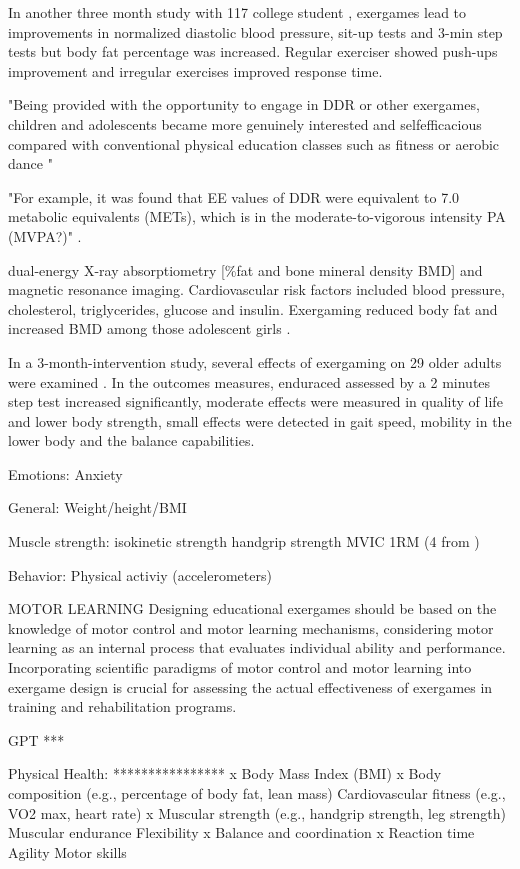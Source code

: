 In another three month study with 117 college student \cite{huang2017can}, exergames lead to improvements in normalized diastolic blood pressure, sit-up tests and 3-min step tests but body fat percentage was increased. Regular exerciser showed push-ups improvement and irregular exercises improved response time.

"Being provided with the opportunity to engage in DDR or other exergames, children and adolescents became more genuinely interested and selfefficacious compared with conventional physical education classes such as fitness or aerobic dance "

"For example, it was found that EE values of DDR were equivalent to 7.0 metabolic equivalents (METs), which is in the moderate-to-vigorous intensity PA (MVPA?)" \cite{gao2014field}.


dual-energy X-ray absorptiometry [\%fat and bone mineral density {BMD}] and magnetic resonance imaging. Cardiovascular risk factors included blood pressure, cholesterol, triglycerides, glucose and insulin.
Exergaming reduced body fat and increased BMD among those adolescent girls \cite{staiano2017randomized}.

In a 3-month-intervention study, several effects of exergaming on 29 older adults were examined \cite{neumann2018effects}. In the outcomes measures, enduraced assessed by a 2 minutes step test increased significantly, moderate effects were measured in quality of life and lower body strength, small effects were detected in gait speed, mobility in the lower body and the balance capabilities.



Emotions:
Anxiety

General:
Weight/height/BMI

Muscle strength: 
isokinetic strength
handgrip strength
MVIC
1RM (4 from \cite{viana2021effects})

Behavior:
Physical activiy (accelerometers)


MOTOR LEARNING
Designing educational exergames should be based on the knowledge of motor control and motor learning mechanisms, considering motor learning as an internal process that evaluates individual ability and performance. Incorporating scientific paradigms of motor control and motor learning into exergame design is crucial for assessing the actual effectiveness of exergames in training and rehabilitation programs. \cite{di2012exergames}


GPT
***

Physical Health:
****************
x Body Mass Index (BMI)
x Body composition (e.g., percentage of body fat, lean mass)
Cardiovascular fitness (e.g., VO2 max, heart rate)
x Muscular strength (e.g., handgrip strength, leg strength)
Muscular endurance
Flexibility
x Balance and coordination
x Reaction time
Agility
Motor skills

